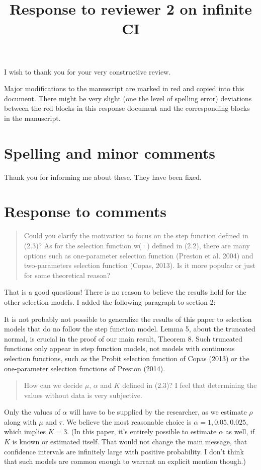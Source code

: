 \documentclass[a4paper]{article}
\title{Response to reviewer 2 on infinite CI}
\begin{document}
\maketitle
I wish to thank you for your very constructive review.


Major modifications to the manuscript are marked in red and copied into this document. There might be very slight (one the level of spelling error) deviations between the red blocks in this response document and the corresponding blocks in the manuscript.

\section*{Spelling and minor comments}Thank you for informing me about these. They have been fixed.

\section*{Response to comments}

\begin{quote}
Could you clarify the motivation to focus on the step function defined
in (2.3)? As for the selection function w(·) defined in (2.2), there are
many options such as one-parameter selection function (Preston et al.
2004) and two-parameters selection function (Copas, 2013). Is it more
popular or just for some theoretical reason?
\end{quote}

That is a good questions! There is no reason to believe the results hold for the other selection models. I added the following paragraph to section 2:

{\color{red}It is not probably not possible to generalize the results of this paper to selection models that do no follow the step function model. Lemma 5, about the truncated normal, is crucial in the proof of our main result, Theorem 8. Such truncated functions only appear in step function models, not models with continuous selection functions, such as the Probit selection function of Copas (2013) or the one-parameter selection functions of Preston (2014).}

\begin{quote}
How can we decide $\mu$, $\alpha$ and $K$ defined in (2.3)? I feel that determining the values without data is very subjective.
\end{quote}

Only the values of $\alpha$ will have to be supplied by the researcher, as we estimate $\rho$ along with $\mu$ and $\tau$. We believe the most reasonable choice is $\alpha = 1, 0.05, 0.025$, which implies $K=3$. (In this paper, it's entirely possible to estimate $\alpha$ as well, if $K$ is known or estimated itself. That would not change the main message, that confidence intervals are infinitely large with positive probability. I don't think that such models are common enough to warrant an explicit mention though.) 
\end{document}
